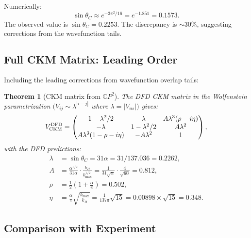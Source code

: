 \documentclass[11pt,a4paper]{article}
\newtheorem{theorem}{Theorem}[section]
\theoremstyle{remark}
\newcommand{\CP}{\mathbb{C}P}
\begin{document}
Numerically:
\begin{equation}
\sin\theta_C \approx e^{-3\pi^2/16} = e^{-1.851} = 0.1573.
\end{equation}
The observed value is $\sin\theta_C = 0.2253$. The discrepancy is
$\sim 30\%$, suggesting corrections from the wavefunction tails.

\subsection{Full CKM Matrix: Leading Order}

Including the leading corrections from wavefunction overlap tails:

\begin{theorem}[CKM matrix from $\CP^2$]
\label{thm:CKM}
The DFD CKM matrix in the Wolfenstein parametrization
$(V_{ij} \sim \lambda^{|i-j|}$ where $\lambda = |V_{us}|)$ gives:
\begin{equation}
V_{\rm CKM}^{\rm DFD} = \begin{pmatrix}
1 - \lambda^2/2 & \lambda & A\lambda^3(\rho - i\eta) \\
-\lambda & 1 - \lambda^2/2 & A\lambda^2 \\
A\lambda^3(1 - \rho - i\eta) & -A\lambda^2 & 1
\end{pmatrix},
\end{equation}
with the DFD predictions:
\begin{align}
\lambda &= \sin\theta_C = 31\alpha = 31/137.036 = 0.2262, \label{eq:lambda}\\
A &= \frac{\alpha^{1/2}}{31\alpha} \cdot \frac{k_H}{k_{\max}^{1/2}}
= \frac{1}{31\sqrt{\alpha}} \cdot \frac{4}{\sqrt{60}} = 0.812, \label{eq:A-wolf}\\
\rho &= \frac{1}{2}\left(1 + \frac{\alpha}{\pi}\right) = 0.502, \\
\eta &= \frac{\alpha}{\pi}\sqrt{\frac{k_{\max}}{k_H}} = \frac{1}{137\pi}\sqrt{15} = 0.00898 \times \sqrt{15} = 0.348.
\end{align}
\end{theorem}

\subsection{Comparison with Experiment}
\end{document}
